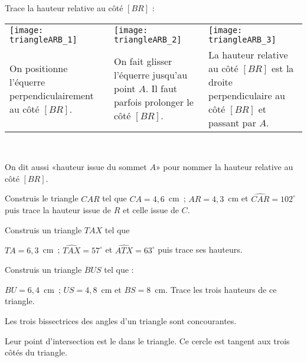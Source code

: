 \begin{methode*1}

 \begin{exemple*1}
 Trace la hauteur relative au côté $[BR]$ :
 \begin{tabularx}{\textwidth}{X|X|X}
 \texttt{[image: triangleARB\_1]} &  \texttt{[image: triangleARB\_2]} & \texttt{[image: triangleARB\_3]} \\ 
 On positionne l'équerre perpendiculairement au côté $[BR]$. & On fait glisser l'équerre jusqu'au point $A$. Il faut parfois prolonger le côté $[BR]$. & La hauteur relative au côté $[BR]$ est la droite perpendiculaire au côté $[BR]$ et passant par $A$. \\
\end{tabularx} \\

\end{exemple*1}

\begin{remarque}
On dit aussi «hauteur issue du sommet $A$» pour nommer la hauteur relative au côté $[BR]$.
 \end{remarque}
 
\exercice
Construis le triangle $CAR$ tel que 
$CA = 4,6$ cm ; $AR = 4,3$ cm et $\widehat{CAR} = 102^\circ$ puis trace la hauteur issue de $R$ et celle issue de $C$.
\vspace{2cm}
     
\exercice
Construis un triangle $TAX$ tel que 

$TA = 6,3$ cm ; $\widehat{TAX} = 57^\circ$ et $\widehat{ATX} = 63^\circ$ puis trace ses hauteurs.
\vspace{2cm}

\exercice
Construis un triangle $BUS$ tel que :

$BU = 6,4$ cm ; $US = 4,8$ cm et $BS = 8$ cm. Trace les trois hauteurs de ce triangle.

\end{methode*1}




 \newpage
 
 \begin{aconnaitre}
Les trois bissectrices des angles d'un triangle sont concourantes. 

Leur point d'intersection est le  dans le triangle. Ce cercle est tangent aux trois côtés du triangle.
 \end{aconnaitre}
 
